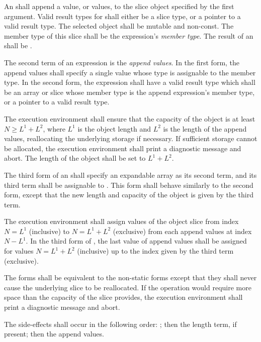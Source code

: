 \specsubsubitem
An  shall append a value, or values, to the
slice object specified by the first argument. Valid result types for
 shall either be a slice type, or a pointer to a
valid result type. The selected object shall be mutable and non-const. The
member type of this slice shall be the expression's \textit{member type}. The
result of an  shall be .

\specsubsubitem
The second term of an  expression is the \textit{append
values}. In the first form, the append values shall specify a single value
whose type is assignable to the member type. In the second form, the expression
shall have a valid result type which shall be an array or slice whose member
type is the append expression's member type, or a pointer to a valid result
type.

\specsubsubitem
The execution environment shall ensure that the capacity of the object is at
least $N \geq L^1 + L^2$, where $L^1$ is the object length and $L^2$ is the
length of the append values, reallocating the underlying storage if necessary.
If sufficient storage cannot be allocated, the execution environment shall
print a diagnostic message and abort. The length of the object shall be set to
$L^1 + L^2$.

\specsubsubitem
The third form of an  shall specify an
expandable array as its second term, and its third term shall be assignable to
. This form shall behave similarly to the second form, except
that the new length and capacity of the object is given by the third term.

\specsubsubitem
The execution environment shall assign values of the object slice from index
$N = L^1$ (inclusive) to $N = L^1 + L^2$ (exclusive) from each append values at
index $N-L^1$. In the third form of , the last
value of append values shall be assigned for values $N = L^1 + L^2$ (inclusive)
up to the index given by the third term (exclusive).

\specsubsubitem
The  forms shall be equivalent to the non-static forms except
that they shall never cause the underlying slice to be reallocated. If the
operation would require more space than the capacity of the slice provides, the
execution environment shall print a diagnostic message and abort.

\specsubsubitem
The side-effects shall occur in the following order:
; then the length term, if present; then the
append values.

